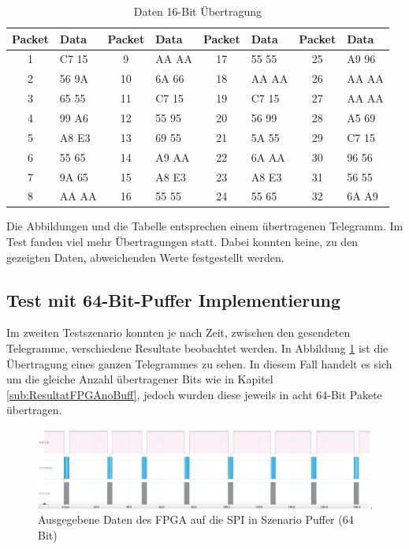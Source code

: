 \begin{table}[h!]
    \centering
    \begin{tabular}{cl||cl||cl||cl}
        \toprule
        \textbf{Packet} & \textbf{Data} & \textbf{Packet} & \textbf{Data} & \textbf{Packet} & \textbf{Data} & \textbf{Packet} & \textbf{Data} \\ 
        \midrule
        1  & C7 15 & 9  & AA AA & 17 & 55 55 & 25 & A9 96 \\
        2  & 56 9A & 10 & 6A 66 & 18 & AA AA & 26 & AA AA \\
        3  & 65 55 & 11 & C7 15 & 19 & C7 15 & 27 & AA AA \\
        4  & 99 A6 & 12 & 55 95 & 20 & 56 99 & 28 & A5 69 \\
        5  & A8 E3 & 13 & 69 55 & 21 & 5A 55 & 29 & C7 15 \\
        6  & 55 65 & 14 & A9 AA & 22 & 6A AA & 30 & 96 56 \\
        7  & 9A 65 & 15 & A8 E3 & 23 & A8 E3 & 31 & 56 55 \\
        8  & AA AA & 16 & 55 55 & 24 & 55 65 & 32 & 6A A9 \\
        \bottomrule
    \end{tabular}
    \caption{Daten 16-Bit Übertragung}
    \label{tab:packet_data}
\end{table}

Die Abbildungen und die Tabelle entsprechen einem übertragenen Telegramm. Im Test fanden viel mehr Übertragungen statt. Dabei konnten keine, zu den gezeigten Daten, abweichenden Werte festgestellt werden.

\subsection{Test mit 64-Bit-Puffer Implementierung}
\label{sub:ResultatFPGABuff}
Im zweiten Testszenario konnten je nach Zeit, zwischen den gesendeten Telegramme, verschiedene Resultate beobachtet werden. In Abbildung \ref{fig:ResultatFPGABuff} ist die Übertragung eines ganzen Telegrammes zu sehen. In diesem Fall handelt es sich um die gleiche Anzahl übertragener Bits wie in Kapitel \ref{sub:ResultatFPGAnoBuff}, jedoch wurden diese jeweils in acht 64-Bit Pakete übertragen.

\begin{figure}[H]
    \centering
    \includegraphics[width=1\linewidth]{Figures/Chap4/FPGA/Test_FPGA_Buff_signal.png}
    \caption{Ausgegebene Daten des FPGA auf die SPI in Szenario Puffer (64 Bit)}
    \label{fig:ResultatFPGABuff}
\end{figure}

